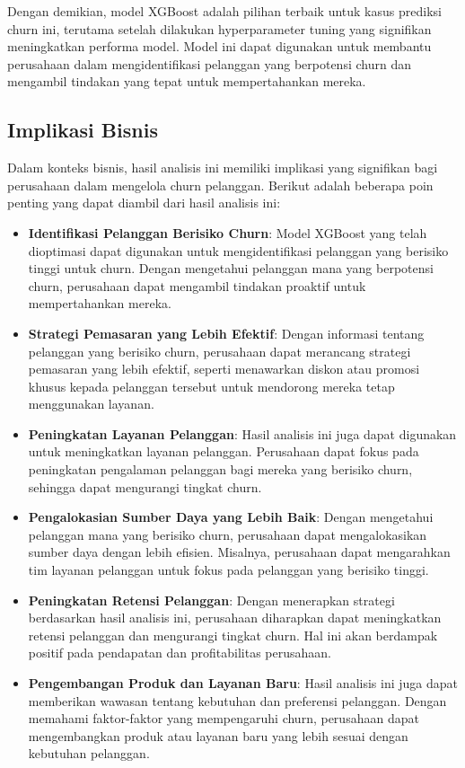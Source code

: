 Dengan demikian, model XGBoost adalah pilihan terbaik untuk kasus prediksi churn ini, terutama setelah dilakukan hyperparameter tuning yang signifikan meningkatkan performa model. Model ini dapat digunakan untuk membantu perusahaan dalam mengidentifikasi pelanggan yang berpotensi churn dan mengambil tindakan yang tepat untuk mempertahankan mereka.

\subsection{Implikasi Bisnis}
Dalam konteks bisnis, hasil analisis ini memiliki implikasi yang signifikan bagi perusahaan dalam mengelola churn pelanggan. Berikut adalah beberapa poin penting yang dapat diambil dari hasil analisis ini:
\begin{itemize}
    \item \textbf{Identifikasi Pelanggan Berisiko Churn}: Model XGBoost yang telah dioptimasi dapat digunakan untuk mengidentifikasi pelanggan yang berisiko tinggi untuk churn. Dengan mengetahui pelanggan mana yang berpotensi churn, perusahaan dapat mengambil tindakan proaktif untuk mempertahankan mereka.
    \item \textbf{Strategi Pemasaran yang Lebih Efektif}: Dengan informasi tentang pelanggan yang berisiko churn, perusahaan dapat merancang strategi pemasaran yang lebih efektif, seperti menawarkan diskon atau promosi khusus kepada pelanggan tersebut untuk mendorong mereka tetap menggunakan layanan.
    \item \textbf{Peningkatan Layanan Pelanggan}: Hasil analisis ini juga dapat digunakan untuk meningkatkan layanan pelanggan. Perusahaan dapat fokus pada peningkatan pengalaman pelanggan bagi mereka yang berisiko churn, sehingga dapat mengurangi tingkat churn.
    \item \textbf{Pengalokasian Sumber Daya yang Lebih Baik}: Dengan mengetahui pelanggan mana yang berisiko churn, perusahaan dapat mengalokasikan sumber daya dengan lebih efisien. Misalnya, perusahaan dapat mengarahkan tim layanan pelanggan untuk fokus pada pelanggan yang berisiko tinggi.
    \item \textbf{Peningkatan Retensi Pelanggan}: Dengan menerapkan strategi berdasarkan hasil analisis ini, perusahaan diharapkan dapat meningkatkan retensi pelanggan dan mengurangi tingkat churn. Hal ini akan berdampak positif pada pendapatan dan profitabilitas perusahaan.
    \item \textbf{Pengembangan Produk dan Layanan Baru}: Hasil analisis ini juga dapat memberikan wawasan tentang kebutuhan dan preferensi pelanggan. Dengan memahami faktor-faktor yang mempengaruhi churn, perusahaan dapat mengembangkan produk atau layanan baru yang lebih sesuai dengan kebutuhan pelanggan.
\end{itemize}
